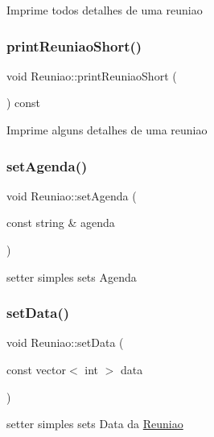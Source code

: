 Imprime todos detalhes de uma reuniao \hypertarget{class_reuniao_aaebc1a93242f44e618292f2e946cd9ff}{}\label{class_reuniao_aaebc1a93242f44e618292f2e946cd9ff} 
\subsubsection{\texorpdfstring{print\+Reuniao\+Short()}{printReuniaoShort()}}
{\footnotesize\ttfamily void Reuniao\+::print\+Reuniao\+Short (\begin{DoxyParamCaption}{ }\end{DoxyParamCaption}) const}

Imprime alguns detalhes de uma reuniao \hypertarget{class_reuniao_abbd435487bf4dcec1d5b030bebe92528}{}\label{class_reuniao_abbd435487bf4dcec1d5b030bebe92528} 
\subsubsection{\texorpdfstring{set\+Agenda()}{setAgenda()}}
{\footnotesize\ttfamily void Reuniao\+::set\+Agenda (\begin{DoxyParamCaption}\item[{const string \&}]{agenda }\end{DoxyParamCaption})}

setter simples sets Agenda \hypertarget{class_reuniao_a36323d2065772e005fe9609e84289fd5}{}\label{class_reuniao_a36323d2065772e005fe9609e84289fd5} 
\subsubsection{\texorpdfstring{set\+Data()}{setData()}}
{\footnotesize\ttfamily void Reuniao\+::set\+Data (\begin{DoxyParamCaption}\item[{const vector$<$ int $>$}]{data }\end{DoxyParamCaption})}

setter simples sets Data da \hyperlink{class_reuniao}{Reuniao} \hypertarget{class_reuniao_aa67dc8030f5c5df36396127bb25a369e}{}\label{class_reuniao_aa67dc8030f5c5df36396127bb25a369e} 
